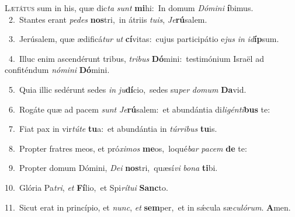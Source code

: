 \lettrine{\initial\textcolor{\initialcolor}{L}}{ætátus} sum in his, quæ dic\textit{ta} \textit{sunt} \textbf{mi}\-hi:~\star In domum \textit{Dó}\-\textit{mi}\textit{ni} \textbf{í}\-bimus.\\
{\numbfont\textcolor{\numbcolor}{~2.}}~Stantes erant \textit{pe}\-\textit{des} \textbf{nos}\-tri,~\star in átriis \textit{tu}\-\textit{is}, \textit{Je}\-\textbf{rú}salem.\par
{\numbfont\textcolor{\numbcolor}{~3.}}~Jerúsalem, quæ ædificá\textit{tur} \textit{ut} \textbf{cí}\-vitas:~\star cujus participátio e\textit{jus} \textit{in} \textit{id}\-\textbf{íp}sum.\par
{\numbfont\textcolor{\numbcolor}{~4.}}~Illuc enim ascendérunt tribus, \textit{tri}\-\textit{bus} \textbf{Dó}\-mini:~\star testimónium Israël ad confiténdum \textit{nó}\-\textit{mi}\textit{ni} \textbf{Dó}\-mini.\par
{\numbfont\textcolor{\numbcolor}{~5.}}~Quia illic sedérunt sedes \textit{in} \textit{ju}\-\textbf{dí}cio,~\star sedes su\textit{per} \textit{do}\-\textit{mum} \textbf{Da}\-vid.\par
{\numbfont\textcolor{\numbcolor}{~6.}}~Rogáte quæ ad pacem \textit{sunt} \textit{Je}\-\textbf{rú}salem:~\star et abundántia di\-\textit{li}\-\textit{gén}\textit{ti}\textbf{bus} te:\par
{\numbfont\textcolor{\numbcolor}{~7.}}~Fiat pax in vir\-\textit{tú}\-\textit{te} \textbf{tu}\-a:~\star et abundántia in \textit{túr}\-\textit{ri}\textit{bus} \textbf{tu}\-is.\par
{\numbfont\textcolor{\numbcolor}{~8.}}~Propter fratres meos, et pró\-\textit{xi}\-\textit{mos} \textbf{me}\-os,~\star loqué\textit{bar} \textit{pa}\-\textit{cem} \textbf{de} te:\par
{\numbfont\textcolor{\numbcolor}{~9.}}~Propter domum Dómini, \textit{De}\-\textit{i} \textbf{nos}\-tri,~\star quæsí\textit{vi} \textit{bo}\-\textit{na} \textbf{ti}\-bi.\par
{\numbfont\textcolor{\numbcolor}{10.}}~Glória Pa\-\textit{tri}\-, \textit{et} \textbf{Fí}\-lio,~\star et Spi\-\textit{rí}\-\textit{tu}\textit{i} \textbf{Sanc}\-to.\par
{\numbfont\textcolor{\numbcolor}{11.}}~Sicut erat in princípio, et \textit{nunc}\-, \textit{et} \textbf{sem}\-per,~\star et in sǽcula sæ\-\textit{cu}\-\textit{ló}\textit{rum}. \textbf{A}\-men.\par
